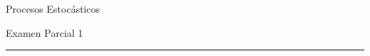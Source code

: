 \documentclass{report}
\begin{document}
\begin{center}
    \textsf{\Large Procesos Estocásticos}
    \par\medskip
    \textsf{\large Examen Parcial 1}
    \end{center}
    \hrule
    \par\bigskip

\begin{enumerate}
%

\end{enumerate}
\end{document}
